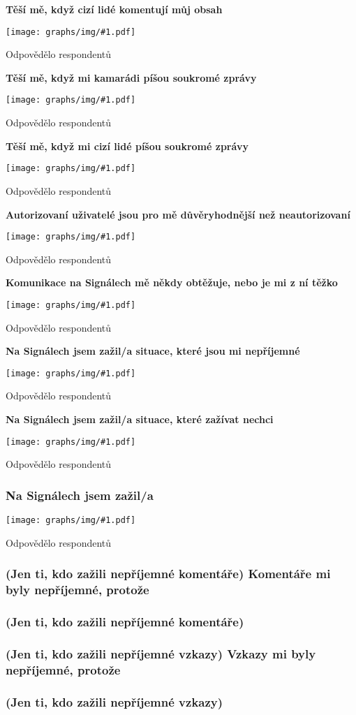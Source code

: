 \documentclass[12pt, a4paper, twoside]{article}
\newcommand{\answercount}[1]{Odpovědělo  respondentů}
\newcommand{\includegraph}[1]{
  \texttt{[image: graphs/img/\#1.pdf]}

  \answercount{#1}
}
\begin{document}
\textbf{Těší mě, když cizí lidé komentují můj obsah}

\includegraph{ostatni_tesi_me_komentar_cizi}

\textbf{Těší mě, když mi kamarádi píšou soukromé zprávy}

\includegraph{ostatni_tesi_me_zprava_kamaradi}

\textbf{Těší mě, když mi cizí lidé píšou soukromé zprávy}

\includegraph{ostatni_tesi_me_zprava_cizi}

\textbf{Autorizovaní uživatelé jsou pro mě důvěryhodnější než neautorizovaní}

\includegraph{ostatni_autorizovani_duveryhodnejsi}

\textbf{Komunikace na Signálech mě někdy obtěžuje, nebo je mi z ní těžko}

\includegraph{ostatni_neprijemne_komunikace_obtezuje}

\textbf{Na Signálech jsem zažil/a situace, které jsou mi nepříjemné}

\includegraph{ostatni_neprijemne_neprijemne_situace}

\textbf{Na Signálech jsem zažil/a situace, které zažívat nechci}

\includegraph{ostatni_neprijemne_zazivat_nechci}

\subsubsection{Na Signálech jsem zažil/a}

\includegraph{neprijemne_co}

\subsubsection{(Jen ti, kdo zažili nepříjemné komentáře) Komentáře mi byly nepříjemné, protože}

\subsubsection{(Jen ti, kdo zažili nepříjemné komentáře)}

\subsubsection{(Jen ti, kdo zažili nepříjemné vzkazy) Vzkazy mi byly nepříjemné, protože}

\subsubsection{(Jen ti, kdo zažili nepříjemné vzkazy)}
\end{document}
